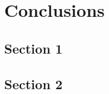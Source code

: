
\chapter{Conclusions} %
\label{ch:conclusions}
\lipsum[50]

\section{Section 1}
\lipsum[50]

\section{Section 2}
\lipsum[50]
